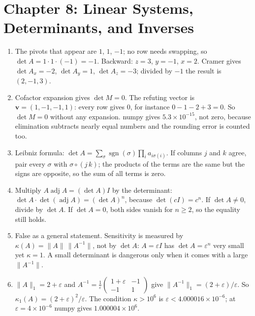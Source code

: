 \section*{Chapter 8: Linear Systems, Determinants, and Inverses}
\begin{enumerate}[label=\textbf{8.\arabic*}]
  \item The pivots that appear are $1$, $1$, $-1$; no row needs swapping, so
        $\det A=1\cdot1\cdot(-1)=-1$. Backward: $z=3$, $y=-1$, $x=2$. Cramer
        gives $\det A_{x}=-2$, $\det A_{y}=1$, $\det A_{z}=-3$; divided by $-1$
        the result is $(2,-1,3)$.

  \item Cofactor expansion gives $\det M=0$. The refuting vector is
        $\mathbf{v}=(1,-1,-1,1)$: every row gives $0$, for instance
        $0-1-2+3=0$. So $\det M=0$ without any expansion. numpy gives
        $5.3\times10^{-15}$, not zero, because elimination subtracts nearly equal
        numbers and the rounding error is counted too.

  \item Leibniz formula: $\det A=\sum_{\sigma}\operatorname{sgn}(\sigma)
        \prod_{i}a_{i\sigma(i)}$. If columns $j$ and $k$ agree, pair every
        $\sigma$ with $\sigma\circ(j\,k)$; the products of the terms are the same but
        the signs are opposite, so the sum of all terms is zero.

  \item Multiply $A\operatorname{adj}A=(\det A)I$ by the determinant:
        $\det A\cdot\det(\operatorname{adj}A)=(\det A)^{n}$, because
        $\det(cI)=c^{n}$. If $\det A\ne0$, divide by $\det A$. If
        $\det A=0$, both sides vanish for $n\ge2$, so the equality still holds.

  \item False as a general statement. Sensitivity is measured by
        $\kappa(A)=\lVert A\rVert\,\lVert A^{-1}\rVert$, not by $\det A$:
        $A=\varepsilon I$ has $\det A=\varepsilon^{n}$ very small yet
        $\kappa=1$. A small determinant is dangerous only when it comes with a
        large $\lVert A^{-1}\rVert$.

  \item $\lVert A\rVert_{1}=2+\varepsilon$ and
        $A^{-1}=\frac1\varepsilon\begin{pmatrix}1+\varepsilon&-1\\-1&1\end{pmatrix}$
        give $\lVert A^{-1}\rVert_{1}=(2+\varepsilon)/\varepsilon$. So
        $\kappa_{1}(A)=(2+\varepsilon)^{2}/\varepsilon$. The condition $\kappa>10^{6}$
        is $\varepsilon<4.000016\times10^{-6}$; at
        $\varepsilon=4\times10^{-6}$ numpy gives $1.000004\times10^{6}$.


\end{enumerate}
